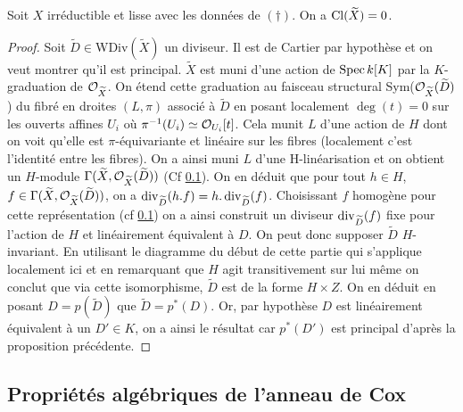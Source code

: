 \label{clgtrivial}
\begin{thm}
Soit $X$ irréductible et lisse avec les données de $(\dagger)$. On a $\operatorname{Cl}(\widetilde{X})=0$.
\end{thm}
\begin{proof}
Soit $\widetilde{D}\in $WDiv$(\widetilde{X})$ un diviseur. Il est de Cartier par hypothèse et on veut montrer qu'il est principal. $\widetilde{X}$ est muni d'une action de $\operatorname{Spec} k[K]$ par la $K$-graduation de $\mathcal{O}_{\widetilde{X}}$. On étend cette graduation au faisceau structural Sym($\mathcal{O}_{\widetilde{X}}(\widetilde{D})$) du fibré en droites $(L,\pi)$ associé à $\widetilde{D}$ en posant localement $\deg(t)=0$ sur les ouverts affines $U_i$ où $\pi^{-1}(U_i)\simeq \mathcal{O}_{U_i}[t]$. Cela munit $L$ d'une action de $H$ dont on voit qu'elle est $\pi$-équivariante et linéaire sur les fibres (localement c'est l'identité entre les fibres). On a ainsi muni $L$ d'une H-linéarisation et on obtient un $H$-module $\Gamma(\widetilde{X}, \mathcal{O}_{\widetilde{X}}(\widetilde{D}))$ (Cf \ref{}). On en déduit que pour tout $h\in H$, $f\in \Gamma(\widetilde{X}, \mathcal{O}_{\widetilde{X}}(\widetilde{D}))$, on a $\operatorname{div}_{\widetilde{D}}(h.f)=h.\operatorname{div}_{\widetilde{D}}(f)$. Choisissant $f$ homogène pour cette représentation (cf \ref{}) on a ainsi construit un diviseur $\operatorname{div}_{\widetilde{D}}(f)$ fixe pour l'action de $H$ et linéairement équivalent à $D$. On peut donc supposer $\widetilde{D}$ $H$-invariant. En utilisant le diagramme du début de cette partie qui s'applique localement ici et en remarquant que $H$ agit transitivement sur lui même on conclut que via cette isomorphisme, $\widetilde{D}$ est de la forme $H\times Z$. On en déduit en posant $D=p(\widetilde{D})$ que $\widetilde{D}=p^*(D)$. Or, par hypothèse $D$ est linéairement équivalent à un $D'\in K$, on a ainsi le résultat car $p^*(D')$ est principal d'après la proposition précédente.
\end{proof}

\subsection{Propriétés algébriques de l'anneau de Cox}


